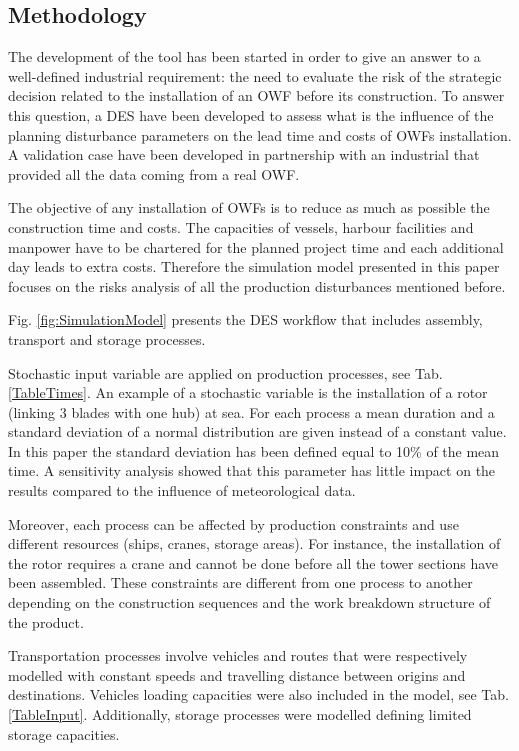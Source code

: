 \subsection{Methodology}
The development of the tool has been started in order to give an answer to a well-defined industrial requirement: the need to evaluate the risk of the strategic decision related to the installation of an OWF before its construction. To answer this question, a DES have been developed to assess what is the influence of the planning disturbance parameters on the lead time and costs of OWFs installation. A validation case have been developed in partnership with an industrial that provided all the data coming from a real OWF.

The objective of any installation of OWFs is to reduce as much as possible the construction time and costs. The capacities of vessels, harbour facilities and manpower have to be chartered for the planned project time and each additional day leads to extra costs. Therefore the simulation model presented in this paper focuses on the risks analysis of all the production disturbances mentioned before.

Fig. \ref{fig:SimulationModel} presents the DES workflow that includes assembly, transport and storage processes.

Stochastic input variable are applied on production processes, see Tab. \ref{TableTimes}. An example of a stochastic variable is the installation of a rotor (linking 3 blades with one hub) at sea. For each process a mean duration and a standard deviation of a normal distribution are given instead of a constant value. In this paper the standard deviation has been defined equal to 10\% of the mean time. A sensitivity analysis showed that this parameter has little impact on the results compared to the influence of meteorological data.

Moreover, each process can be affected by production constraints and use different resources (ships, cranes, storage areas). For instance, the installation of the rotor requires a crane and cannot be done before all the tower sections have been assembled. These constraints are different from one process to another depending on the construction sequences and the work breakdown structure of the product.

Transportation processes involve vehicles and routes that were respectively modelled with constant speeds and travelling distance between origins and destinations. Vehicles loading capacities were also included in the model, see Tab. \ref{TableInput}. Additionally, storage processes were modelled defining limited storage capacities.

